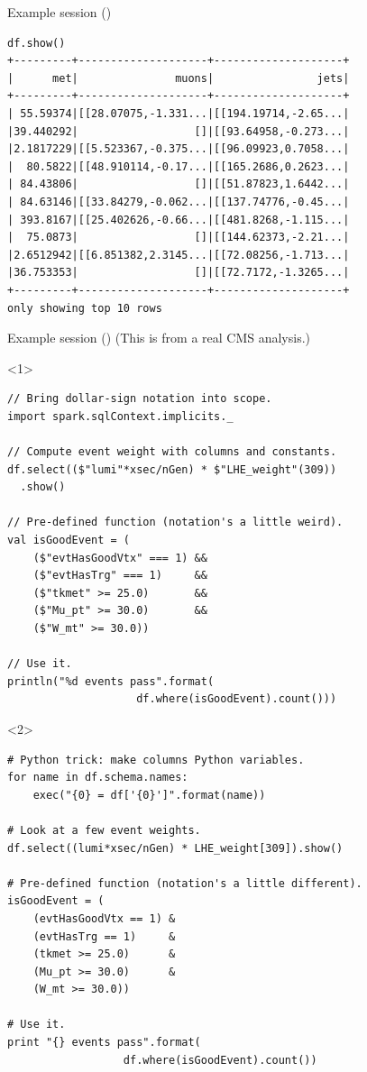\documentclass{beamer}
\begin{document}
\begin{frame}[fragile]{Example session ()}
\small
\begin{verbatim}
df.show()
+---------+--------------------+--------------------+
|      met|               muons|                jets|
+---------+--------------------+--------------------+
| 55.59374|[[28.07075,-1.331...|[[194.19714,-2.65...|
|39.440292|                  []|[[93.64958,-0.273...|
|2.1817229|[[5.523367,-0.375...|[[96.09923,0.7058...|
|  80.5822|[[48.910114,-0.17...|[[165.2686,0.2623...|
| 84.43806|                  []|[[51.87823,1.6442...|
| 84.63146|[[33.84279,-0.062...|[[137.74776,-0.45...|
| 393.8167|[[25.402626,-0.66...|[[481.8268,-1.115...|
|  75.0873|                  []|[[144.62373,-2.21...|
|2.6512942|[[6.851382,2.3145...|[[72.08256,-1.713...|
|36.753353|                  []|[[72.7172,-1.3265...|
+---------+--------------------+--------------------+
only showing top 10 rows
\end{verbatim}
\end{frame}

\begin{frame}[fragile]{Example session ()}
\vspace{0.25 cm}
(This is from a real CMS analysis.)

\begin{onlyenv}<1>
\small
\begin{verbatim}
// Bring dollar-sign notation into scope.
import spark.sqlContext.implicits._

// Compute event weight with columns and constants.
df.select(($"lumi"*xsec/nGen) * $"LHE_weight"(309))
  .show()

// Pre-defined function (notation's a little weird).
val isGoodEvent = (
    ($"evtHasGoodVtx" === 1) &&
    ($"evtHasTrg" === 1)     &&
    ($"tkmet" >= 25.0)       &&
    ($"Mu_pt" >= 30.0)       &&
    ($"W_mt" >= 30.0))

// Use it.
println("%d events pass".format(
                    df.where(isGoodEvent).count()))
\end{verbatim}
\end{onlyenv}

\begin{onlyenv}<2>
\small
\begin{verbatim}
# Python trick: make columns Python variables.
for name in df.schema.names:
    exec("{0} = df['{0}']".format(name))

# Look at a few event weights.
df.select((lumi*xsec/nGen) * LHE_weight[309]).show()

# Pre-defined function (notation's a little different).
isGoodEvent = (
    (evtHasGoodVtx == 1) &
    (evtHasTrg == 1)     &
    (tkmet >= 25.0)      &
    (Mu_pt >= 30.0)      &
    (W_mt >= 30.0))

# Use it.
print "{} events pass".format(
                  df.where(isGoodEvent).count())
\end{verbatim}
\end{onlyenv}
\end{frame}
\end{document}
